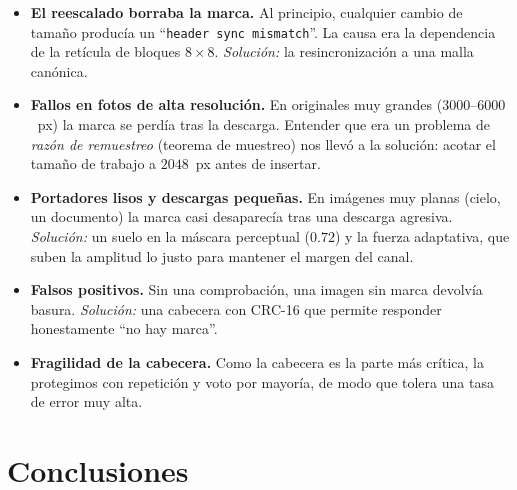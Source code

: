 \documentclass[12pt,a4paper]{article}
\renewcommand{\nobreakdash}{}
\begin{document}
\begin{itemize}[leftmargin=1.6em]
\item \textbf{El reescalado borraba la marca.} Al principio, cualquier cambio de tamaño
producía un ``\texttt{header sync mismatch}''. La causa era la dependencia de la retícula de
bloques $8\times 8$. \emph{Solución:} la resincronización a una malla canónica.
\item \textbf{Fallos en fotos de alta resolución.} En originales muy grandes
($3000$--$6000$~px) la marca se perdía tras la descarga. Entender que era un problema de
\emph{razón de remuestreo} (teorema de muestreo) nos llevó a la solución: acotar el tamaño de
trabajo a $2048$~px antes de insertar.
\item \textbf{Portadores lisos y descargas pequeñas.} En imágenes muy planas (cielo, un
documento) la marca casi desaparecía tras una descarga agresiva. \emph{Solución:} un suelo en
la máscara perceptual ($0{.}72$) y la fuerza adaptativa, que suben la amplitud lo justo para
mantener el margen del canal.
\item \textbf{Falsos positivos.} Sin una comprobación, una imagen sin marca devolvía basura.
\emph{Solución:} una cabecera con CRC\nobreakdash-16 que permite responder honestamente ``no
hay marca''.
\item \textbf{Fragilidad de la cabecera.} Como la cabecera es la parte más crítica, la
protegimos con repetición y voto por mayoría, de modo que tolera una tasa de error muy alta.
\end{itemize}

\section{Conclusiones}
\end{document}
